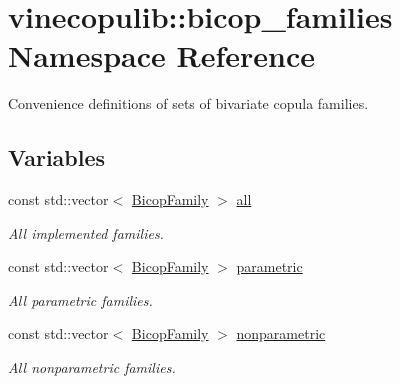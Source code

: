 \hypertarget{namespacevinecopulib_1_1bicop__families}{}\section{vinecopulib\+:\+:bicop\+\_\+families Namespace Reference}
\label{namespacevinecopulib_1_1bicop__families}


Convenience definitions of sets of bivariate copula families.  


\subsection*{Variables}
\begin{DoxyCompactItemize}
\item 
\mbox{\label{namespacevinecopulib_1_1bicop__families_a5214a513f41ec23b74782aab96ea6774}} 
const std\+::vector$<$ \hyperlink{namespacevinecopulib_a42e95cc06d33896199caab0c11ad44f3}{Bicop\+Family} $>$ \hyperlink{namespacevinecopulib_1_1bicop__families_a5214a513f41ec23b74782aab96ea6774}{all}
\begin{DoxyCompactList}\small\item\em All implemented families. \end{DoxyCompactList}\item 
\mbox{\label{namespacevinecopulib_1_1bicop__families_a76d66bb6cb03ae4de1cef3d1ed70ac16}} 
const std\+::vector$<$ \hyperlink{namespacevinecopulib_a42e95cc06d33896199caab0c11ad44f3}{Bicop\+Family} $>$ \hyperlink{namespacevinecopulib_1_1bicop__families_a76d66bb6cb03ae4de1cef3d1ed70ac16}{parametric}
\begin{DoxyCompactList}\small\item\em All parametric families. \end{DoxyCompactList}\item 
\mbox{\label{namespacevinecopulib_1_1bicop__families_a01c7c990cc34b1b74d115858a52fcdc5}} 
const std\+::vector$<$ \hyperlink{namespacevinecopulib_a42e95cc06d33896199caab0c11ad44f3}{Bicop\+Family} $>$ \hyperlink{namespacevinecopulib_1_1bicop__families_a01c7c990cc34b1b74d115858a52fcdc5}{nonparametric}
\begin{DoxyCompactList}\small\item\em All nonparametric families. \end{DoxyCompactList}\item 

\end{DoxyCompactItemize}
